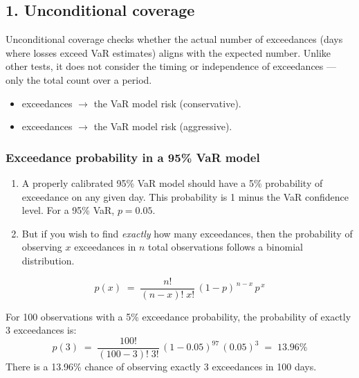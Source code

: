 \subsection{1. Unconditional coverage}
Unconditional coverage checks whether the actual number of exceedances (days where losses exceed
VaR estimates) aligns with the expected number. Unlike other tests, it does not consider the
timing or independence of exceedances --- only the total count over a period.

\begin{mrtrapbox}[title={Reading the direction}]
\begin{itemize}
\item {} exceedances $\rightarrow$ the VaR model  risk
      (conservative).
\item {} exceedances $\rightarrow$ the VaR model  risk
      (aggressive).
\end{itemize}
\end{mrtrapbox}

\subsubsection{Exceedance probability in a 95\% VaR model}
\begin{enumerate}
\item A properly calibrated 95\% VaR model should have a 5\% probability of exceedance on any
      given day. This probability is 1 minus the VaR confidence level. For a 95\% VaR,
      $p = 0.05$.
\item But if you wish to find \textit{exactly} how many exceedances, then the probability of
      observing $x$ exceedances in $n$ total observations follows a binomial distribution.
\end{enumerate}

\begin{mrfmlbox}
\[ p(x) \;=\; \frac{n!}{(n-x)!\;x!}\,(1-p)^{\,n-x}\, p^{\,x} \]
\end{mrfmlbox}

\begin{mrexbox}[title={Example --- exactly three exceedances}]
For 100 observations with a 5\% exceedance probability, the probability of exactly 3
exceedances is:
\tcblower
\small
\[ p(3) \;=\; \frac{100!}{(100-3)!\;3!}\,(1-0.05)^{97}\,(0.05)^{3} \;=\; \mathbf{13.96\%} \]
There is a 13.96\% chance of observing exactly 3 exceedances in 100 days.
\end{mrexbox}

